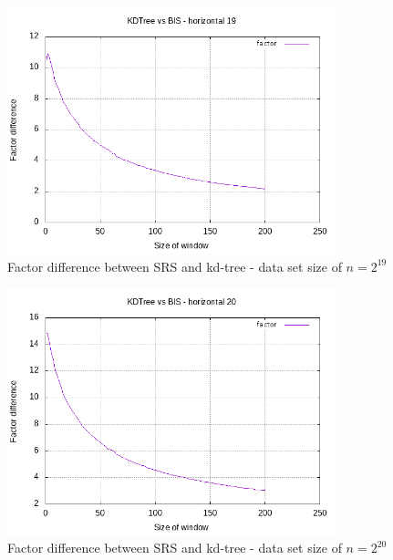 \begin{figure}[h]
    \centering
    \includegraphics[width = 0.85\textwidth]{pictures/analysis/smalls/hori_fac_19.png}
    \caption{Factor difference between SRS and kd-tree - data set size of $n=2^{19}$}\label{fig:small_hori_fac_19}
\end{figure}

\begin{figure}[h]
    \centering
    \includegraphics[width = 0.85\textwidth]{pictures/analysis/smalls/hori_fac_20.png}
    \caption{Factor difference between SRS and kd-tree - data set size of $n=2^{20}$}\label{fig:small_hori_fac_20}
\end{figure}

